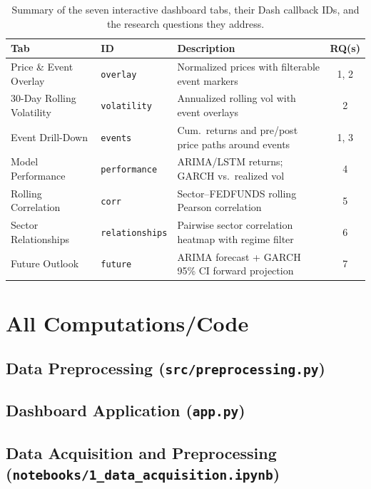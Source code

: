 \documentclass[12pt]{article}
\begin{document}
\begin{table}[H]
\centering
\caption{Summary of the seven interactive dashboard tabs, their Dash callback IDs, and the research questions they address.}
\begin{tabular}{llp{4.5cm}c}
\toprule
\textbf{Tab} & \textbf{ID} & \textbf{Description} & \textbf{RQ(s)} \\
\midrule
Price \& Event Overlay   & \texttt{overlay}      & Normalized prices with filterable event markers       & 1, 2 \\
30-Day Rolling Volatility& \texttt{volatility}   & Annualized rolling vol with event overlays            & 2    \\
Event Drill-Down         & \texttt{events}       & Cum.\ returns and pre/post price paths around events  & 1, 3 \\
Model Performance        & \texttt{performance}  & ARIMA/LSTM returns; GARCH vs.\ realized vol           & 4    \\
Rolling Correlation      & \texttt{corr}         & Sector--FEDFUNDS rolling Pearson correlation          & 5    \\
Sector Relationships     & \texttt{relationships}& Pairwise sector correlation heatmap with regime filter& 6    \\
Future Outlook           & \texttt{future}       & ARIMA forecast + GARCH 95\% CI forward projection     & 7    \\
\bottomrule
\end{tabular}
\end{table}

\section{All Computations/Code}

\subsection{Data Preprocessing (\texttt{src/preprocessing.py})}       

            

\subsection{Dashboard Application (\texttt{app.py})}



\subsection{Data Acquisition and Preprocessing (\texttt{notebooks/1\_data\_acquisition.ipynb})}
\end{document}
